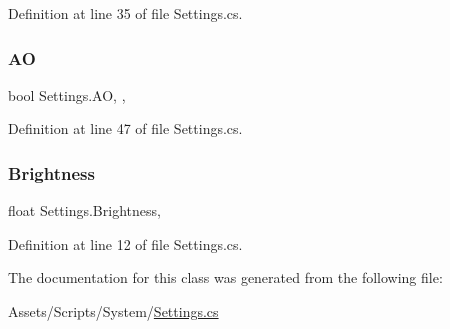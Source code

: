 Definition at line 35 of file Settings.\+cs.

\mbox{\label{class_settings_ae83f45bca825b6f2ffb6a93b6f407897}} 
\subsubsection{\texorpdfstring{AO}{AO}}
{\footnotesize\ttfamily bool Settings.\+AO\hspace{0.3cm}{\ttfamily [static]}, {\ttfamily [get]}, {\ttfamily [set]}}



Definition at line 47 of file Settings.\+cs.

\mbox{\label{class_settings_a86a333469505eeb5f5313df5855487bf}} 
\subsubsection{\texorpdfstring{Brightness}{Brightness}}
{\footnotesize\ttfamily float Settings.\+Brightness\hspace{0.3cm}{\ttfamily [get]}, {\ttfamily [set]}}



Definition at line 12 of file Settings.\+cs.



The documentation for this class was generated from the following file\+:\begin{DoxyCompactItemize}
\item 
Assets/\+Scripts/\+System/\mbox{\hyperlink{_settings_8cs}{Settings.\+cs}}\end{DoxyCompactItemize}
